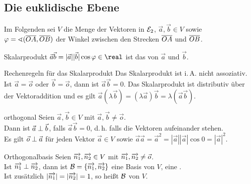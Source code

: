 \subsection{%
    Die euklidische Ebene%
}

\begin{Bem}
    Im Folgenden sei $V$ die Menge der Vektoren in $\mathcal{E}_2$,
    $\vec{a}, \vec{b} \in V$ sowie
    $\varphi = \sphericalangle(\overline{OA}, \overline{OB})$ der Winkel zwischen
    den Strecken $\overline{OA}$ und $\overline{OB}$.
\end{Bem}

\pagebreak

\begin{Def}{Skalarprodukt}
    $\vec{a} \vec{b} = |\vec{a}| |\vec{b}| \cos \varphi \in \real$
    ist das  von $\vec{a}$ und $\vec{b}$.
\end{Def}

\begin{Satz}{Rechenregeln für das Skalarprodukt}
    Das Skalarprodukt ist i.\,A. nicht assoziativ.
    Ist $\vec{a} = \vec{o}$ oder $\vec{b} = \vec{o}$, dann ist
    $\vec{a} \vec{b} = 0$.
    Das Skalarprodukt ist distributiv über der Vektoraddition und
    es gilt $\vec{a} (\lambda \vec{b}) =
    (\lambda \vec{a}) \vec{b} = \lambda (\vec{a} \vec{b})$.
\end{Satz}

\begin{Def}{orthogonal}
    Seien $\vec{a}, \vec{b} \in V$ mit
    $\vec{a}, \vec{b} \not= \vec{o}$. \\
    Dann ist $\vec{a} \;\bot\; \vec{b}$, falls $\vec{a} \vec{b} = 0$,
    d.\,h. falls die Vektoren  aufeinander stehen. \\
    Es gilt $\vec{o} \;\bot\; \vec{a}$ für jeden Vektor $\vec{a} \in V$
    sowie $\vec{a} \vec{a} = \vec{a}^2 =
    |\vec{a}| |\vec{a}| \cos 0 = |\vec{a}|^2$.
\end{Def}

\begin{Def}{Orthogonalbasis}
    Seien $\overrightarrow{n_1}, \overrightarrow{n_2} \in V$ mit
    $\overrightarrow{n_1}, \overrightarrow{n_2} \not= \vec{o}$. \\
    Ist $\overrightarrow{n_1} \;\bot\; \overrightarrow{n_2}$, dann ist
    $\mathcal{B} = \{\overrightarrow{n_1}, \overrightarrow{n_2}\}$ eine Basis von $V$,
    eine . \\
    Ist zusätzlich $|\overrightarrow{n_1}| = |\overrightarrow{n_2}| = 1$, so heißt
    $\mathcal{B}$  von $V$.
\end{Def}

